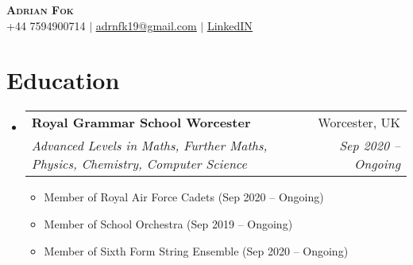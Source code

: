 \documentclass[letterpaper,11pt]{article}
\makeatletter
\newcommand{\resumeItemSmall}[2]{

  \item\small{
    {\indent #1 (#2)}
  }
}
\newcommand{\resumeSubheading}[4]{
  \vspace{-1pt}\item
    \begin{tabular*}{0.97\textwidth}{l@{\extracolsep{\fill}}r}
      \textbf{#1} & #2 \\
      \textit{\small#3} & \textit{\small #4} \\
    \end{tabular*}\vspace{-5pt}
}
\newcommand{\resumeSubHeadingListStart}{\begin{itemize}[leftmargin=*,label={}]}
\newcommand{\resumeSubHeadingListEnd}{\end{itemize}}
\newcommand{\resumeItemListStart}{\begin{itemize}[label={}]}
\newcommand{\resumeItemListEnd}{\end{itemize}\vspace{-5pt}}
\makeatother
\begin{document}

\begin{center}
    \textbf{\Huge \scshape Adrian Fok} \\ \vspace{1pt}
    \small +44 7594900714 $|$ \href{mailto:adrnfk19@gmail.com}{\underline {adrnfk19@gmail.com}} $|$ \href{https://linkedin.com/in/...}{\underline{LinkedIN}} 
\end{center}
	

\section{Education}
  \resumeSubHeadingListStart
    \resumeSubheading
      {Royal Grammar School Worcester}{Worcester, UK}
      {Advanced Levels in Maths, Further Maths, Physics, Chemistry, Computer Science}{Sep 2020 -- Ongoing}
	  \resumeItemListStart
        \resumeItemSmall{Member of Royal Air Force Cadets}{Sep 2020 -- Ongoing}
        \resumeItemSmall{Member of School Orchestra}{Sep 2019 -- Ongoing}
		\resumeItemSmall{Member of Sixth Form String Ensemble}{Sep 2020 -- Ongoing}
      \resumeItemListEnd
  \resumeSubHeadingListEnd
 
 

 
\end{document}
